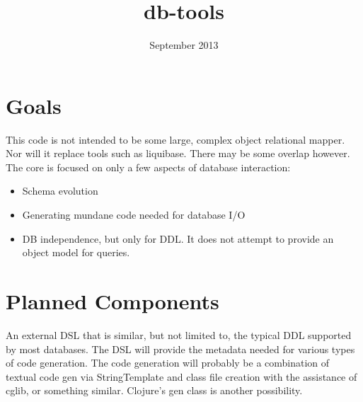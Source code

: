 \documentclass[10pt]{article}
\title{db-tools}
\date{September 2013}
\begin{document}
 \maketitle
\section{Goals}
This code is not intended to be some large, complex object relational mapper. 
Nor will it replace tools such as liquibase. There may be some overlap however. The core 
is focused on only a few aspects of database interaction: 
\begin{itemize}
	\item Schema evolution
	\item Generating mundane code needed for database I/O
    \item DB independence, but only for DDL. It does not attempt to provide an object model for queries.
\end{itemize}

\section{Planned Components}
An external DSL that is similar, but not limited to, the typical DDL supported by most databases. 
The DSL will provide the metadata needed for various types of code generation. The code 
generation will probably be a combination of textual code gen via StringTemplate and class file 
creation with the assistance of cglib, or something similar. Clojure's gen class is another possibility.



\end{document}
